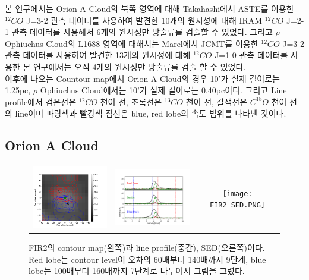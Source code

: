 본 연구에서는 Orion A Cloud의 북쪽 영역에 대해 Takahashi에서 ASTE를 이용한 $^{12}CO$ J=3-2 관측 데이터를 사용하여 발견한 10개의 원시성에 대해 IRAM $^{12}CO$ J=2-1 관측 데이터를 사용해서 6개의 원시성만 방출류를 검출할 수 있었다.\cite{Takahashi}
그리고 $\rho$ Ophiuchus Cloud의 L1688 영역에 대해서는 Marel에서 JCMT를 이용한 $^{12}CO$ J=3-2 관측 데이터를 사용하여 발견한 13개의 원시성에 대해 $^{12}CO$ J=1-0 관측 데이터를 사용한 본 연구에서는 오직 4개의 원시성만 방출류를 검출 할 수 있었다. \cite{Marel}
\\
이후에 나오는 Countour map에서 Orion A Cloud의 경우 10'가 실제 길이로는 1.25pc, $\rho$ Ophiuchus Cloud에서는 10'가 실제 길이로는 0.40pc이다. 그리고 Line profile에서 검은선은 $^{12}CO$ 천이 선, 초록선은 $^{13}CO$ 천이 선, 갈색선은 $C^{18}O$ 천이 선의 line이며 파랑색과 빨강색 점선은 blue, red lobe의 속도 범위를 나타낸 것이다.


\subsection{Orion A Cloud}

\begin{figure}[h!]
	\begin{center}
		\begin{tabular}{ccc}
			\includegraphics[width=5cm]{Orion_12CO2-1_FIR2_rbcontour_400_modified.png} &   \includegraphics[width=5cm]{Orion_12CO2-1_FIR2_line_profile_400.png} &
			\texttt{[image: FIR2\_SED.PNG]} \\
		\end{tabular}
		\caption{FIR2의 contour map(왼쪽)과 line profile(중간), SED(오른쪽)이다. Red lobe는 contour level이 오차의 60배부터 140배까지 9단계, blue lobe는 100배부터 160배까지 7단계로 나누어서 그림을 그렸다.}
	\end{center}
\end{figure}

